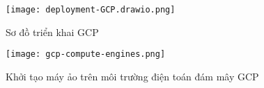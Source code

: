 \begin{table}[h]
    \centering
    \caption{Phân bố vai trò và địa chỉ IP của các máy chủ trong VPN Wireguard}
    \label{tab:wireguard-distribution}
\end{table}

\begin{figure}[h]
    \centering
    \texttt{[image: deployment-GCP.drawio.png]}
    \caption{Sơ đồ triển khai GCP}
    \label{fig:deployment-gcp}
\end{figure}

\begin{figure}[h]
    \centering
    \texttt{[image: gcp-compute-engines.png]}
    \caption{Khởi tạo máy ảo trên môi trường điện toán đám mây GCP}
\end{figure}

